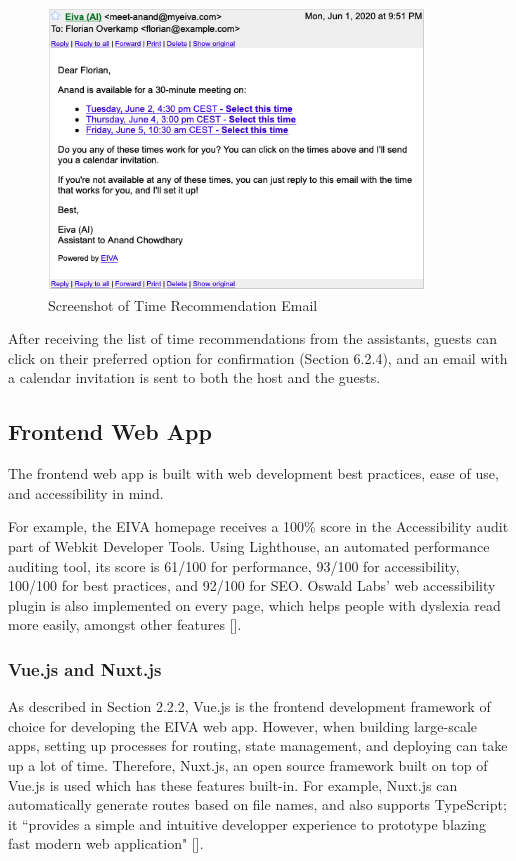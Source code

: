 \documentclass{article}
\begin{document}
\begin{figure}
	\center
	\includegraphics[width=10cm]{screenshot-dates.png}
	\caption{Screenshot of Time Recommendation Email}
\end{figure}

After receiving the list of time recommendations from the assistants, guests can click on their preferred option for confirmation (Section 6.2.4), and an email with a calendar invitation is sent to both the host and the guests.

\subsection{Frontend Web App}

The frontend web app is built with web development best practices, ease of use, and accessibility in mind.

For example, the EIVA homepage receives a 100\% score in the Accessibility audit part of Webkit Developer Tools. Using Lighthouse, an automated performance auditing tool, its score is 61/100 for performance, 93/100 for accessibility, 100/100 for best practices, and 92/100 for SEO. Oswald Labs' web accessibility plugin is also implemented on every page, which helps people with dyslexia read more easily, amongst other features [].

\subsubsection{Vue.js and Nuxt.js}

As described in Section 2.2.2, Vue.js is the frontend development framework of choice for developing the EIVA web app. However, when building large-scale apps, setting up processes for routing, state management, and deploying can take up a lot of time. Therefore, Nuxt.js, an open source framework built on top of Vue.js is used which has these features built-in. For example, Nuxt.js can automatically generate routes based on file names, and also supports TypeScript; it ``provides a simple and intuitive developper experience to prototype blazing fast modern web application" [].
\end{document}
